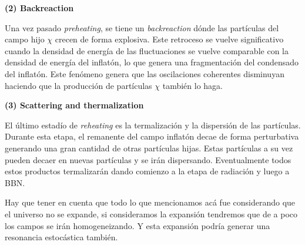\noindent
\textbf{(2) Backreaction}

Una vez pasado \textit{preheating}, se tiene un \textit{backreaction} dónde las partículas del campo hijo $\chi$ crecen de forma explosiva. Este retroceso se vuelve significativo cuando la densidad de energía de las fluctuaciones se vuelve comparable con la densidad de energía del inflatón, lo que genera una fragmentación del condensado del inflatón. Este fenómeno genera que las oscilaciones coherentes disminuyan haciendo que la producción de partículas $\chi$ también lo haga.

\noindent
\textbf{(3) Scattering and thermalization}

El último estadío de \textit{reheating} es la termalización y la dispersión de las partículas. Durante esta etapa, el remanente del campo inflatón decae de forma perturbativa generando una gran cantidad de otras partículas hijas. Estas partículas a su vez pueden decaer en nuevas partículas y se irán dispersando. Eventualmente todos estos productos termalizarán dando comienzo a la etapa de radiación y luego a BBN.

Hay que tener en cuenta que todo lo que mencionamos acá fue considerando que el universo no se expande, si consideramos la expansión tendremos que de a poco los campos se irán homogeneizando. Y esta expansión podría generar una resonancia estocástica también.
